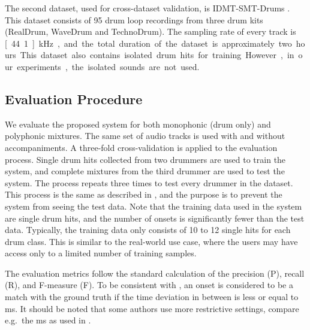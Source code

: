 \documentclass{article}
\begin{document}
The second dataset, used for cross-dataset validation, is IDMT-SMT-Drums \cite{Dittmar2014}. This dataset consists of 95 drum loop recordings from three drum kits (RealDrum, WaveDrum and TechnoDrum). The sampling rate of every track is \unit[44.1]{kHz}, and the total duration of the dataset is approximately two hours. This dataset also contains isolated drum hits for training. However, in our experiments, the isolated sounds are not used.   

\subsection{Evaluation Procedure}\label{subsec:evaluation procedure}
We evaluate the proposed system for both monophonic (drum only) and polyphonic mixtures. The same set of audio tracks is used with and without accompaniments. A three-fold cross-validation is applied to the evaluation process. Single drum hits collected from two drummers are used to train the system, and complete mixtures from the third drummer are used to test the system. The process repeats three times to test every drummer in the dataset. This process is the same as described in \cite{Paulus2009a}, and the purpose is to prevent the system from seeing the test data. Note that the training data used in the system are single drum hits, and the number of onsets is significantly fewer than the test data. Typically, the training data only consists of 10 to 12 single hits for each drum class. This is similar to the real-world use case, where the users may have access only to a limited number of training samples. 

The evaluation metrics follow the standard calculation of the precision (P), recall (R), and F-measure (F). To be consistent with \cite{gillet_transcription_2008}, an onset is considered to be a match with the ground truth if the time deviation in between is less or equal to \unit[50]{ms}. It should be noted that some authors use more restrictive settings, compare e.g.\ the \unit[30]{ms} as used in \cite{Paulus2009a}. 
\end{document}
